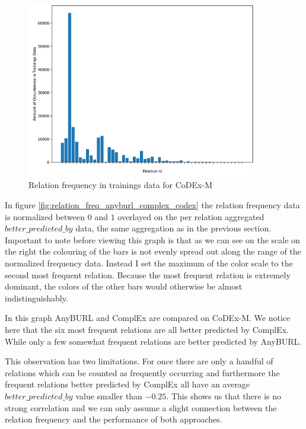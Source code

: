 \begin{figure}[H]
\centering
\includegraphics[width=0.9\textwidth]{images/relation_freq_codex.PNG}
\caption{Relation frequency in trainings data for CoDEx-M}
\label{fig:relation_freq_codex}
\end{figure}

In figure \ref{fig:relation_freq_anyburl_complex_codex} the relation frequency data is normalized between $0$ and $1$ overlayed on the per relation aggregated $better\_predicted\_by$ data, the same aggregation as in the previous section. Important to note before viewing this graph is that as we can see on the scale on the right the colouring of the bars is not evenly spread out along the range of the normalized frequency data. Instead I set the maximum of the color scale to the second most frequent relation. Because the most frequent relation is extremely dominant, the colors of the other bars would otherwise be almost indistinguishably. 

In this graph AnyBURL and ComplEx are compared on CoDEx-M. We notice here that the six most frequent relations are all better predicted by ComplEx. While only a few somewhat frequent relations are better predicted by AnyBURL. 

This observation has two limitations. For once there are only a handful of relations which can be counted as frequently occurring and furthermore the frequent relations better predicted by ComplEx all have an average $better\_predicted\_by$ value smaller than $-0.25$. This shows us that there is no strong correlation and we can only assume a slight connection between the relation frequency and the performance of both approaches.

